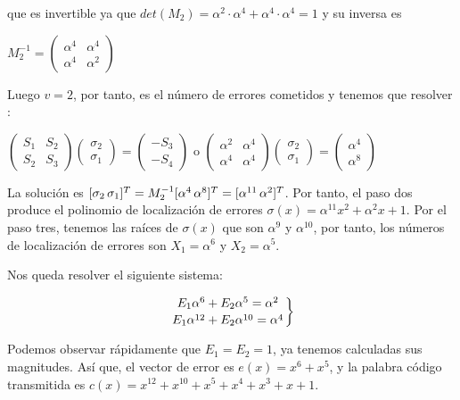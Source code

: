 \begin{exampleth}
que es invertible ya que $det(M_2) = \alpha^2 \cdot \alpha^4 + \alpha^4 \cdot \alpha^4 = 1$  y su inversa es 

$M_2^{-1} = \begin{pmatrix}
			\alpha^4 & \alpha^4  \\
			\alpha^4 & \alpha^2
	\end{pmatrix}$
	
Luego $v=2$, por tanto, es el número de errores cometidos y tenemos que resolver :

$\begin{pmatrix}
			S_1 & S_2  \\
			S_2 & S_3
	\end{pmatrix} \begin{pmatrix}
			\sigma_2 \\
			\sigma_1
	\end{pmatrix} = \begin{pmatrix}
			 -S_3  \\
			 -S_4
	\end{pmatrix} $ o $\begin{pmatrix}
			\alpha^2 & \alpha^4  \\
			\alpha^4 & \alpha^4
	\end{pmatrix} \begin{pmatrix}
			\sigma_2 \\
			\sigma_1
	\end{pmatrix} = \begin{pmatrix}
			 \alpha^4  \\
			 \alpha^8
	\end{pmatrix} $
	
La solución es $[\sigma_2 \thinspace \sigma_1 ]^T = M_2^{-1}[\alpha^4 \thinspace \alpha^8]^T = [\alpha^{11} \thinspace \alpha^2]^T$. Por tanto, el paso dos produce el polinomio de localización de errores $\sigma(x) = \alpha^{11} x^2 + \alpha^2 x + 1$. Por el paso tres, tenemos las raíces de $\sigma(x)$ que son $\alpha^{9}$ y $\alpha^{10}$, por tanto, los números de localización de errores son $X_1 = \alpha^6$ y $X_2 =\alpha^{5}$. 

Nos queda resolver el siguiente sistema:

\[
	\left.
		E_1 \alpha^6 + E_2 \alpha^5 = \alpha^2 \atop
		E_1 \alpha^{12} + E_2 \alpha^{10} = \alpha^4
		\right\} 
\]

Podemos observar rápidamente que $E_1 = E_2 = 1$, ya tenemos calculadas sus magnitudes. Así que, el vector de error es $e(x) = x^{6} + x^5$, y la palabra código transmitida es $c(x) = x^{12}+x^{10}+x^5+x^4+x^3+x+1$.
\end{exampleth}

